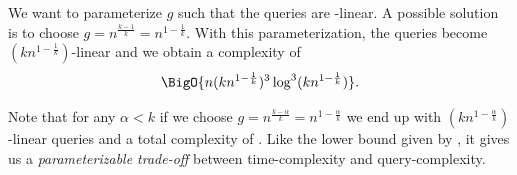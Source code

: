 We want to parameterize \(g\) such that the queries are -linear. A
possible solution is to choose \(g = n^{\frac{k-1}{k}} = n^{1-\frac{1}{k}}\).
With this parameterization, the queries become \((kn^{1-\frac{1}{k}})\)-linear
and we obtain a complexity of
\begin{displaymath}
\BigO{n (kn^{1-\frac{1}{k}})^3 \log^3 (kn^{1-\frac{1}{k}}) }.
\end{displaymath}

Note that for any \(\alpha < k\) if we choose \(g = n^{\frac{k-\alpha}{k}} =
n^{1-\frac{\alpha}{k}}\) we end up with \((kn^{1-\frac{\alpha}{k}})\)-linear
queries and a total complexity of
.
Like the lower bound given by \citet*{ailon:2005}, it gives us a \emph{parameterizable
trade-off} between time-complexity and query-complexity.
